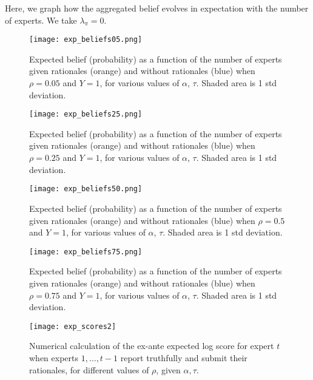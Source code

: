 \documentclass{winnower}
\begin{document}
Here, we graph how the aggregated belief evolves in expectation with the number of experts. We take $\lambda_\pi=0$.

\begin{figure}
\begin{center}
    \texttt{[image: exp\_beliefs05.png]}
    \caption{Expected belief (probability) as a function of the number of experts given rationales (orange) and without rationales (blue) when $\rho=0.05$ and $Y=1$, for various values of $\alpha$, $\tau$. Shaded area is 1 std deviation.}
\end{center}
\end{figure}

\begin{figure}
\begin{center}
    \texttt{[image: exp\_beliefs25.png]}
    \caption{Expected belief (probability) as a function of the number of experts given rationales (orange) and without rationales (blue) when $\rho=0.25$ and $Y=1$, for various values of $\alpha$, $\tau$. Shaded area is 1 std deviation.}
\end{center}
\end{figure}


\begin{figure}
\begin{center}
    \texttt{[image: exp\_beliefs50.png]}
    \caption{Expected belief (probability) as a function of the number of experts given rationales (orange) and without rationales (blue) when $\rho=0.5$ and  $Y=1$, for various values of $\alpha$, $\tau$. Shaded area is 1 std deviation.}
\end{center}
\end{figure}


\begin{figure}
\begin{center}
    \texttt{[image: exp\_beliefs75.png]}
    \caption{Expected belief (probability) as a function of the number of experts given rationales (orange) and without rationales (blue) when $\rho=0.75$ and $Y=1$, for various values of $\alpha$, $\tau$. Shaded area is 1 std deviation.}
\end{center}
\end{figure}


\begin{figure}[ht]\label{fig:expscore}
  \centering
  \texttt{[image: exp\_scores2]}
  \caption{Numerical calculation of the ex-ante expected log score for expert $t$ when experts $1, \ldots, t-1$ report truthfully and submit their rationales, for different values of $\rho$, given $\alpha, \tau$. }
  \label{fig:your-label}
\end{figure}
\end{document}
